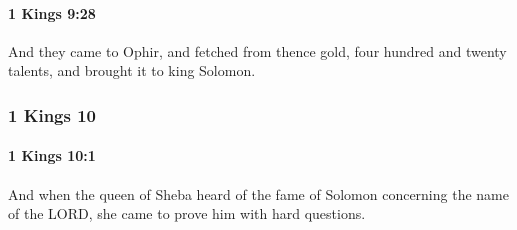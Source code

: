 		\paragraph{1 Kings 9:28} %
			\label{1KINGS-9-28}

			And they came to Ophir, and fetched from thence gold, four hundred and twenty talents, and brought it to king Solomon.

	\subsubsection{1 Kings 10} %
		\label{1KINGS-10}

		\paragraph{1 Kings 10:1} %
			\label{1KINGS-10-1}

			And when the queen of Sheba heard of the fame of Solomon concerning the name of the LORD, she came to prove him with hard questions.

